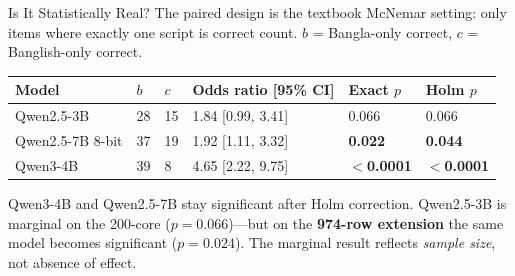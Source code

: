 \documentclass[aspectratio=169,10pt]{beamer}
\newcommand{\gpp}[1]{\textbf{\color{good}#1}}    %
\begin{document}
\begin{frame}{Is It Statistically Real?}
\small
The paired design is the textbook McNemar setting: only items where exactly one script is correct count. $b$ = Bangla-only correct, $c$ = Banglish-only correct.
\vspace{0.3cm}

\centering
\renewcommand{\arraystretch}{1.3}
\begin{tabular}{L{3.2cm} C{1.0cm} C{1.0cm} C{2.8cm} C{1.6cm} C{1.6cm}}
\toprule
\textbf{Model} & $b$ & $c$ & \textbf{Odds ratio [95\% CI]} & \textbf{Exact $p$} & \textbf{Holm $p$}\\
\midrule
Qwen2.5-3B      & 28 & 15 & 1.84 [0.99, 3.41] & 0.066 & 0.066\\
Qwen2.5-7B 8-bit & 37 & 19 & 1.92 [1.11, 3.32] & \gpp{0.022} & \gpp{0.044}\\
Qwen3-4B        & 39 & 8  & 4.65 [2.22, 9.75] & \gpp{$<$0.0001} & \gpp{$<$0.0001}\\
\bottomrule
\end{tabular}
\vspace{0.4cm}

\begin{keybox}
\small Qwen3-4B and Qwen2.5-7B stay significant after Holm correction. Qwen2.5-3B is marginal on the 200-core ($p=0.066$)—but on the \textbf{974-row extension} the same model becomes significant ($p=0.024$). The marginal result reflects \emph{sample size}, not absence of effect.
\end{keybox}
\end{frame}
\end{document}

